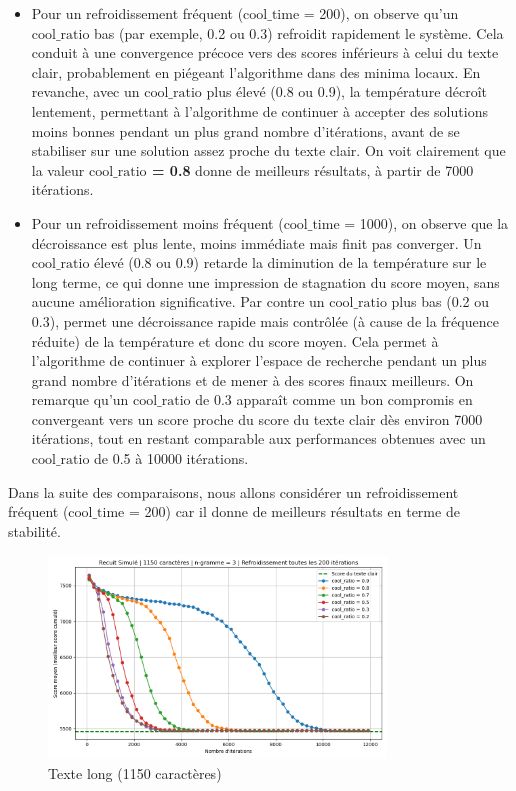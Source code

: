 \documentclass[a4paper]{article}
\begin{document}
\begin{itemize}
    \item Pour un refroidissement fréquent (\(\text{cool\_time}\) = 200), on observe qu'un \textit{\(\text{cool\_ratio}\)} bas (par exemple, 0.2 ou 0.3) refroidit rapidement le système. Cela conduit à une convergence précoce vers des scores inférieurs à celui du texte clair, probablement en piégeant l'algorithme dans des minima locaux. 
          En revanche, avec un \(\text{cool\_ratio}\) plus élevé (0.8 ou 0.9), la température décroît lentement, permettant à l’algorithme de continuer à accepter des solutions moins bonnes pendant un plus grand nombre d’itérations, avant de se stabiliser sur une solution assez proche du texte clair. 
          On voit clairement que la valeur \textbf{\(\text{cool\_ratio}\) = 0.8} donne de meilleurs résultats, à partir de 7000 itérations.
    \item Pour un refroidissement moins fréquent (\(\text{cool\_time}\) = 1000), on observe que la décroissance est plus lente, moins immédiate mais finit pas converger. Un \(\text{cool\_ratio}\) élevé (0.8 ou 0.9) retarde la diminution de la température sur le long terme, ce qui donne une impression de stagnation du score moyen, sans aucune amélioration significative.
          Par contre un \(\text{cool\_ratio}\) plus bas (0.2 ou 0.3), permet une décroissance rapide mais contrôlée (à cause de la fréquence réduite) de la température et donc du score moyen. Cela permet à l'algorithme de continuer à explorer l'espace de recherche pendant un plus grand nombre d'itérations et de mener à des scores finaux meilleurs. 
          On remarque qu'un \(\text{cool\_ratio}\) de 0.3 apparaît comme un bon compromis en convergeant vers un score proche du score du texte clair dès environ 7000 itérations, tout en restant comparable aux performances obtenues avec un \(\text{cool\_ratio}\) de 0.5 à 10000 itérations.
\end{itemize}

Dans la suite des comparaisons, nous allons considérer un refroidissement fréquent (\(\text{cool\_time}\) = 200) car il donne de meilleurs résultats en terme de stabilité.

\begin{figure}[H]
    \centering
    \includegraphics[width=0.8\textwidth, keepaspectratio, height=0.6\textheight]{graphe_recuit_n_3_1150_cool_time_200.png}
    \caption{Texte long (1150 caractères)}
    \label{fig:n3-110-1000}
\end{figure}
\end{document}
